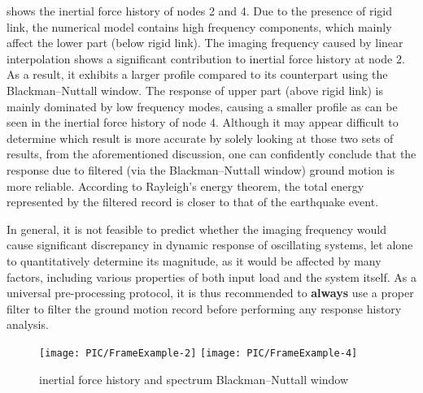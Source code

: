  shows the inertial force history of nodes 2 and 4. Due to the presence of rigid link, the numerical model contains high frequency components, which mainly affect the lower part (below rigid link). The imaging frequency caused by linear interpolation shows a significant contribution to inertial force history at node 2. As a result, it exhibits a larger profile compared to its counterpart using the Blackman--Nuttall window. The response of upper part (above rigid link) is mainly dominated by low frequency modes, causing a smaller profile as can be seen in the inertial force history of node 4. Although it may appear difficult to determine which result is more accurate by solely looking at those two sets of results, from the aforementioned discussion, one can confidently conclude that the response due to filtered (via the Blackman--Nuttall window) ground motion is more reliable. According to Rayleigh’s energy theorem, the total energy represented by the filtered record is closer to that of the earthquake event.

In general, it is not feasible to predict whether the imaging frequency would cause significant discrepancy in dynamic response of oscillating systems, let alone to quantitatively determine its magnitude, as it would be affected by many factors, including various properties of both input load and the system itself. As a universal pre-processing protocol, it is thus recommended to \textbf{always} use a proper filter to filter the ground motion record before performing any response history analysis.
\begin{figure}[htb!]
\centering
\texttt{[image: PIC/FrameExample-2]}
\texttt{[image: PIC/FrameExample-4]}
\caption{inertial force history and spectrum Blackman--Nuttall window}\label{fig:practical_example}
\end{figure}